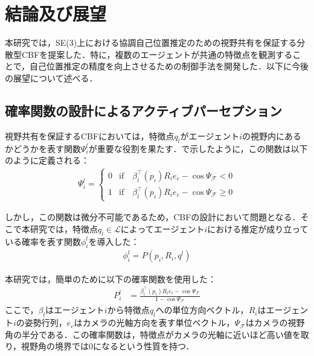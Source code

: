 \section{結論及び展望}

本研究では，SE(3)上における協調自己位置推定のための視野共有を保証する分散型CBFを提案した．特に，複数のエージェントが共通の特徴点を観測することで，自己位置推定の精度を向上させるための制御手法を開発した．以下に今後の展望について述べる．

\subsection{確率関数の設計によるアクティブパーセプション}

視野共有を保証するCBFにおいては，特徴点$q_l$がエージェント$i$の視野内にあるかどうかを表す関数$\Psi_{i}^l$が重要な役割を果たす．で示したように，この関数は以下のように定義される：
\begin{equation}
\begin{aligned}
\Psi_{i}^l = \left\{ \begin{array}{ll}
0 & \mathrm{if} \quad  \beta_l^{\top}(p_i)R_ie_c-\cos\Psi_{\mathcal{F}} < 0\\
1 & \mathrm{if}  \quad  \beta_l^{\top}(p_i)R_ie_c-\cos\Psi_{\mathcal{F}} \geq 0
\end{array} \right.
\end{aligned}
\label{eq:psi_function}
\end{equation}

しかし，この関数は微分不可能であるため，CBFの設計において問題となる．そこで本研究では，特徴点$q_l \in \mathcal{L}$によってエージェント$i$における推定が成り立っている確率を表す関数$\phi_{i}^l$を導入した：
\begin{equation}
\begin{aligned}
\phi_{i}^l= P(p_i,R_i,q^l)
\end{aligned}
\label{eq:phi_function}
\end{equation}

本研究では，簡単のために以下の確率関数を使用した：
\begin{equation}
\begin{aligned}
P_i^l &= \frac{\beta_l^\top(p_i) R_i e_c -\cos\Psi_{\mathcal{F}} }{1-\cos\Psi_{\mathcal{F}}}
\end{aligned}
\label{eq:p_function}
\end{equation}
ここで，$\beta_l$はエージェント$i$から特徴点$q_l$への単位方向ベクトル，$R_i$はエージェント$i$の姿勢行列，$e_c$はカメラの光軸方向を表す単位ベクトル，$\Psi_{\mathcal{F}}$はカメラの視野角の半分である．この確率関数は，特徴点がカメラの光軸に近いほど高い値を取り，視野角の境界では0になるという性質を持つ．

